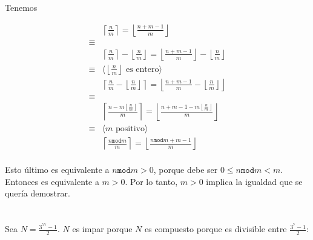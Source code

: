 \documentclass{article}
\newcommand{\piso}[1]{\left \lfloor #1 \right \rfloor}
\newcommand{\techo}[1]{\left \lceil #1 \right \rceil}
\begin{document}
\section{}

Tenemos

\begin{align*}
 & \techo{\frac{n}{m}} = \piso{\frac{n+m-1}{m}} \\
 \equiv & \\
 & \techo{\frac{n}{m}} - \piso{\frac{n}{m}} = \piso{\frac{n+m-1}{m}} - \piso{\frac{n}{m}} \\
 \equiv & \langle \piso{\frac{n}{m}} \text{ es entero} \rangle \\
 & \techo{\frac{n}{m} - \piso{\frac{n}{m}}} = \piso{\frac{n+m-1}{m} - \piso{\frac{n}{m}}} \\
 \equiv & \\
 & \techo{\frac{n - m\piso{\frac{n}{m}}}{m}} = \piso{\frac{n+m-1 - m\piso{\frac{n}{m}}}{m}} \\
 \equiv & \langle m \text{ positivo} \rangle \\
 & \techo{\frac{n \mathtt{mod} m}{m}} = \piso{\frac{n \mathtt{mod} m +m-1}{m}} \\
\end{align*}

Esto último es equivalente a $n \mathtt{mod} m > 0$, porque debe ser
$0 \leq n \mathtt{mod} m < m$.
Entonces es equivalente a $m > 0$. Por lo tanto, $m > 0$ implica la igualdad que se quería
demostrar.

\section{}

Sea $N = \frac{3^77-1}{2}$. $N$ es impar porque 
$N$ es compuesto porque es divisible entre $\frac{3^7-1}{2}$:
\end{document}
